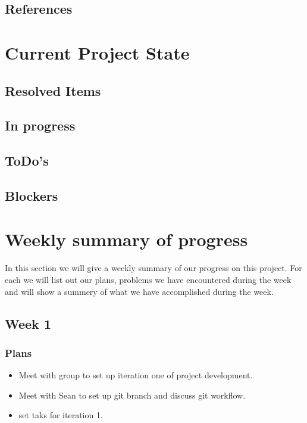 \documentclass[onecolumn, draftclsnofoot,10pt, compsoc]{article}
\begin{document}
		\renewcommand\refname{\vskip -1cm}
		\subsection{References}

		    \nocite{*}
            
            


\section{Current Project State}

	\subsection{Resolved Items}
	
	\subsection{In progress}

	\subsection{ToDo's}

	\subsection{Blockers}


\section{Weekly summary of progress}
	   In this section we will give a weekly summary of our progress on this project. For each we will list out our plans, problems we have encountered during the week and will show a summery of what we have accomplished during the week.\\

		\subsection{Week 1}
			\subsubsection{Plans}
				\begin{itemize}
					\item Meet with group to set up iteration one of project development.
					\item Meet with Sean to set up git branch and discuss git workflow.
					\item set taks for iteration 1.
				\end{itemize}
\end{document}
